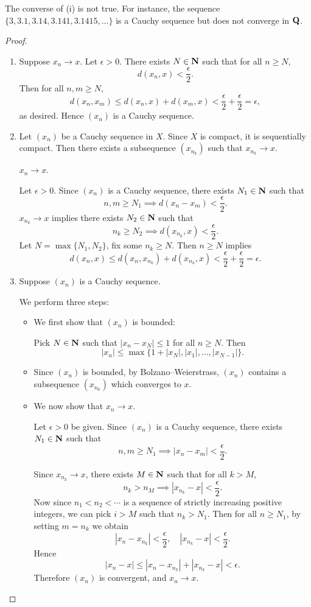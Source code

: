 \begin{remark}
The converse of (i) is not true. For instance, the sequence $\{3,3.1,3.14,3.141,3.1415,\dots\}$ is a Cauchy sequence but does not converge in $\mathbf Q$.
\end{remark}

\begin{proof} \
\begin{enumerate}[label=(\roman*)]
\item Suppose $x_n\to x$. Let $\epsilon>0$. There exists $N\in\mathbf N$ such that for all $n\ge N$,
\[d(x_n,x)<\frac{\epsilon}{2}.\]
Then for all $n,m\ge N$,
\[d(x_n,x_m)\le d(x_n,x)+d(x_m,x)<\frac{\epsilon}{2}+\frac{\epsilon}{2}=\epsilon,\]
as desired. Hence $(x_n)$ is a Cauchy sequence.
\item Let $(x_n)$ be a Cauchy sequence in $X$. Since $X$ is compact, it is sequentially compact. Then there exists a subsequence $(x_{n_k})$ such that $x_{n_k}\to x$.
\begin{claim}
$x_n\to x$.
\end{claim}
Let $\epsilon>0$. Since $(x_n)$ is a Cauchy sequence, there exists $N_1\in\mathbf N$ such that
\[n,m\ge N_1\implies d(x_n-x_m)<\frac{\epsilon}{2}.\]
$x_{n_k}\to x$ implies there exists $N_2\in\mathbf N$ such that
\[n_k\ge N_2\implies d(x_{n_k},x)<\frac{\epsilon}{2}.\]
Let $N=\max\{N_1,N_2\}$, fix some $n_k\ge N$. Then $n\ge N$ implies
\[d(x_n,x)\le d(x_n,x_{n_k})+d(x_{n_k},x)<\frac{\epsilon}{2}+\frac{\epsilon}{2}=\epsilon.\]

\item Suppose $(x_n)$ is a Cauchy sequence.

We perform three steps:
\begin{itemize}
\item We first show that $(x_n)$ is bounded:

Pick $N\in\mathbf N$ such that $|x_n-x_N|\le 1$ for all $n\ge N$. Then
\[|x_n|\le\max\{1+|x_N|,|x_1|,\dots,|x_{N-1}|\}.\]

\item Since $(x_n)$ is bounded, by Bolzano--Weierstrass, $(x_n)$ contains a subsequence $(x_{n_k})$ which converges to $x$.

\item We now show that $x_n\to x$.

Let $\epsilon>0$ be given. Since $(x_n)$ is a Cauchy sequence, there exists $N_1\in\mathbf N$ such that
\[n,m\ge N_1\implies|x_n-x_m|<\frac{\epsilon}{2}.\]

Since $x_{n_k}\to x$, there exists $M\in\mathbf N$ such that for all $k>M$,
\[n_k>n_M\implies |x_{n_k}-x|<\frac{\epsilon}{2}.\]
Now since $n_1<n_2<\cdots$ is a sequence of strictly increasing positive integers, we can pick $i>M$ such that $n_k>N_1$. Then for all $n\ge N_1$, by setting $m=n_k$ we obtain
\[ |x_n-x_{n_k}|<\frac{\epsilon}{2},\quad |x_{n_k}-x| < \frac{\epsilon}{2}.\]
Hence
\[|x_n-x|\le|x_n-x_{n_k}|+|x_{n_k}-x|<\epsilon.\]
Therefore $(x_n)$ is convergent, and $x_n\to x$.
\end{itemize}
\end{enumerate}
\end{proof}

